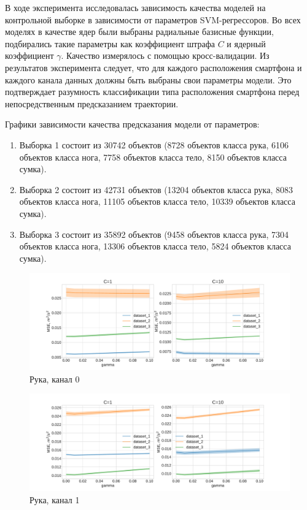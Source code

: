 \documentclass[12pt,twoside]{article}
\begin{document}
В ходе эксперимента исследовалась зависимость качества моделей на контрольной выборке в зависимости от параметров SVM-регрессоров.  Во всех моделях в качестве ядер были выбраны радиальные базисные функции, подбирались такие параметры как коэффициент штрафа $C$ и ядерный коэффициент $\gamma$. Качество измерялось с помощью кросс-валидации. Из результатов эксперимента следует, что для каждого расположения смартфона и каждого канала данных должны быть выбраны свои параметры модели.  Это подтверждает разумность классификации типа расположения смартфона перед непосредственным предсказанием траектории. 

Графики зависимости качества предсказания модели от параметров:

\begin{enumerate}
    \item Выборка 1 состоит из 30742 объектов (8728 объектов класса рука, 6106 объектов класса нога, 7758 объектов класса тело, 8150 объектов класса сумка).
    
    \item Выборка 2 состоит из 42731 объектов (13204 объектов класса рука, 8083 объектов класса нога, 11105 объектов класса тело, 10339 объектов класса сумка).
    
    \item Выборка 3 состоит из 35892 объектов (9458 объектов класса рука, 7304 объектов класса нога, 13306 объектов класса тело, 5824 объектов класса сумка).
    
\end{enumerate}
    
    \begin{figure}[H]
    \includegraphics[scale=0.4]{charts/handheld_chn0_C=10.pdf}
    \caption{Рука, канал 0}
    \label{fig:image}
    \end{figure}
    
    \begin{figure}[H]
    \includegraphics[scale=0.4]{charts/handheld_chn1_C=10.pdf}
    \caption{Рука, канал 1}
    \label{fig:image}
    \end{figure}
    
\end{document}
